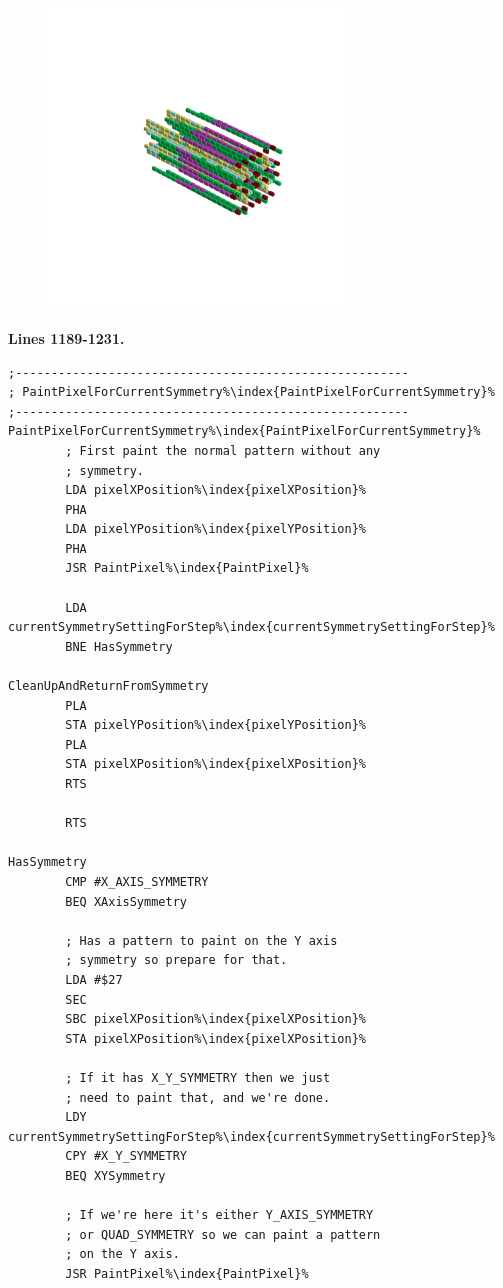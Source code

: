 \begin{minipage}[b]{0.50\linewidth}
\begin{figure}[H]
        \vspace*{-8cm}
        \hspace*{2cm}
        \includegraphics[width=8cm]{src/symmetries/pattern9_4-45.png}
        \vspace*{-2.5cm}
  \caption*{}
  \end{figure}
\end{minipage}

\clearpage
\textbf{Lines 1189-1231. }
\begin{lstlisting}[escapechar=\%]
;-------------------------------------------------------
; PaintPixelForCurrentSymmetry%\index{PaintPixelForCurrentSymmetry}%
;-------------------------------------------------------
PaintPixelForCurrentSymmetry%\index{PaintPixelForCurrentSymmetry}%   
        ; First paint the normal pattern without any
        ; symmetry.
        LDA pixelXPosition%\index{pixelXPosition}%
        PHA 
        LDA pixelYPosition%\index{pixelYPosition}%
        PHA 
        JSR PaintPixel%\index{PaintPixel}%

        LDA currentSymmetrySettingForStep%\index{currentSymmetrySettingForStep}%
        BNE HasSymmetry

CleanUpAndReturnFromSymmetry   
        PLA 
        STA pixelYPosition%\index{pixelYPosition}%
        PLA 
        STA pixelXPosition%\index{pixelXPosition}%
        RTS 

        RTS

HasSymmetry   
        CMP #X_AXIS_SYMMETRY
        BEQ XAxisSymmetry

        ; Has a pattern to paint on the Y axis
        ; symmetry so prepare for that.
        LDA #$27
        SEC 
        SBC pixelXPosition%\index{pixelXPosition}%
        STA pixelXPosition%\index{pixelXPosition}%

        ; If it has X_Y_SYMMETRY then we just 
        ; need to paint that, and we're done.
        LDY currentSymmetrySettingForStep%\index{currentSymmetrySettingForStep}%
        CPY #X_Y_SYMMETRY
        BEQ XYSymmetry

        ; If we're here it's either Y_AXIS_SYMMETRY
        ; or QUAD_SYMMETRY so we can paint a pattern
        ; on the Y axis.
        JSR PaintPixel%\index{PaintPixel}%

\end{lstlisting}
\clearpage

